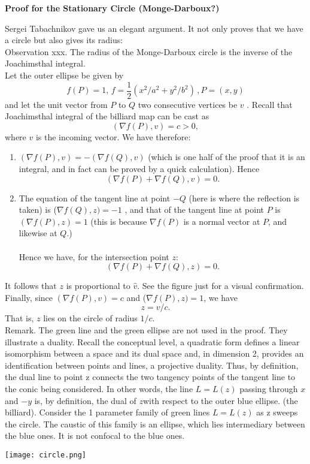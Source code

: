 \documentclass[11pt]{article}
\begin{document}
\begin{center}
{\bf {\large
Proof for the Stationary Circle  (Monge-Darboux?)}}
\end{center}

Sergei Tabachnikov gave us an elegant argument.  It not only proves that we have a circle but also gives its radius: \\

\noindent  Observation xxx.   The radius of the Monge-Darboux circle  is the inverse
of the Joachimsthal integral. \\ 

Let the outer ellipse be given by $$ f(P)=1, \, f =  \frac{1}{2} (x^2/a^2 + y^2/b^2)\,,  P = (x,y) $$ and let the unit vector from $P$ to $Q$  two consecutive vertices be $v$ .  Recall that Joachimsthal integral of the billiard map
can be cast as  $$(\nabla f(P),v)=c > 0, $$  where $v$ is the incoming vector.  We have therefore:\\
\begin{enumerate}
\item   $(\nabla f(P),v) = -(\nabla f(Q),v)$   (which is one half of the proof that it is an integral, and  in fact can be proved by a quick calculation).   Hence 
$$ (\nabla f(P) + \nabla f(Q),v)=0.$$
\item  The equation of the tangent line at point  $-Q$  (here is where the reflection is taken)  is ($\nabla f(Q),z)=-1$ , and that of the tangent line at point $P$ is $(\nabla f(P),z)=1$
 (this is because $\nabla f(P)$ is a normal vector at $P$, and likewise at $Q$.) \\ \\
Hence we have, for the intersection point $z$:  
$$ (\nabla f(P)+ \nabla f(Q),z)=0. $$
\end{enumerate}
It follows that $z$ is proportional to $\hat{v}$.  See the figure just for a visual confirmation.
Finally,  since $(\nabla f(P),v)=c$ and ($\nabla f(P),z)=1$, we have
$$ z = v/c .$$
That is, $z$ lies on the circle of radius $1/c$.\\


\noindent  Remark.  The green line and  the green ellipse are not used in the proof.  They  illustrate a duality.
Recall  the conceptual level, a quadratic form defines a linear isomorphism between a space and its dual space and, in dimension 2, 
 provides an identification between points and lines, a projective duality.
Thus, by definition, the dual line to point z connects the two tangency points of the tangent line to the  conic
being considered. %
In other words, the line 
$ L = L(z) $  passing through $ x$ and  $-y$ is, by definition, the dual of $ z $with respect to the outer blue ellipse.
 (the billiard). %
 Consider the 1 parameter family of green lines $L = L(z)$ as z sweeps the circle. 
 The caustic of this family is an ellipse, which lies intermediary between the blue ones. It is not  confocal to the blue ones. 

 
 $$ $$
  \centering
 \texttt{[image: circle.png]}
\end{document}

